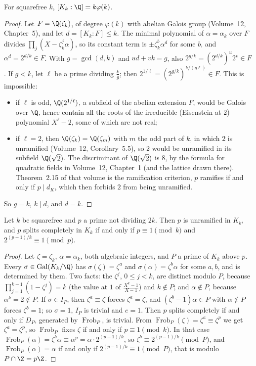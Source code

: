 \begin{lemma}\label{lem:kummerdeg}
For squarefree $k$, $[K_k:\Q]=k\varphi(k)$.
\end{lemma}
\begin{proof}
Let $F=\Q(\zeta_k)$, of degree $\varphi(k)$ with abelian Galois group (Volume~12, Chapter~5), and let $d=[K_k:F]\le k$. The minimal polynomial of $\alpha=\alpha_k$ over $F$ divides $\prod_j(X-\zeta_k^j\alpha)$, so its constant term is $\pm\zeta_k^b\alpha^d$ for some $b$, and $\alpha^d=2^{d/k}\in F$. With $g=\gcd(d,k)$ and $ud+vk=g$, also $2^{g/k}=(2^{d/k})^u2^v\in F$. If $g<k$, let $\ell$ be a prime dividing $\frac kg$; then $2^{1/\ell}=(2^{g/k})^{k/(g\ell)}\in F$. This is impossible:
\begin{itemize}
\item if $\ell$ is odd, $\Q(2^{1/\ell})$, a subfield of the abelian extension $F$, would be Galois over $\Q$, hence contain all the roots of the irreducible (Eisenstein at $2$) polynomial $X^\ell-2$, some of which are not real;
\item if $\ell=2$, then $\Q(\zeta_k)=\Q(\zeta_m)$ with $m$ the odd part of $k$, in which $2$ is unramified (Volume~12, Corollary~5.5), so $2$ would be unramified in its subfield $\Q(\sqrt2)$. The discriminant of $\Q(\sqrt2)$ is $8$, by the formula for quadratic fields in Volume~12, Chapter~1 (and the lattice drawn there). Theorem~2.15 of that volume is the ramification criterion, $p$ ramifies if and only if $p\mid d_K$, which then forbids $2$ from being unramified.
\end{itemize}
So $g=k$, $k\mid d$, and $d=k$.
\end{proof}

\begin{lemma}\label{lem:kummersplit}
Let $k$ be squarefree and $p$ a prime not dividing $2k$. Then $p$ is unramified in $K_k$, and $p$ splits completely in $K_k$ if and only if $p\equiv1\pmod k$ and $2^{(p-1)/k}\equiv1\pmod p$.
\end{lemma}
\begin{proof}
Let $\zeta=\zeta_k$, $\alpha=\alpha_k$, both algebraic integers, and $P$ a prime of $K_k$ above $p$. Every $\sigma\in\operatorname{Gal}(K_k/\Q)$ has $\sigma(\zeta)=\zeta^a$ and $\sigma(\alpha)=\zeta^b\alpha$ for some $a,b$, and is determined by them. Two facts: the $\zeta^j$, $0\le j<k$, are distinct modulo $P$, because $\prod_{j=1}^{k-1}(1-\zeta^j)=k$ (the value at $1$ of $\frac{X^k-1}{X-1}$) and $k\notin P$; and $\alpha\notin P$, because $\alpha^k=2\notin P$.
If $\sigma\in I_P$, then $\zeta^a\equiv\zeta$ forces $\zeta^a=\zeta$, and $(\zeta^b-1)\alpha\in P$ with $\alpha\notin P$ forces $\zeta^b=1$; so $\sigma=1$, $I_P$ is trivial and $e=1$.
Then $p$ splits completely if and only if $D_P$, generated by $\operatorname{Frob}_P$, is trivial. From $\operatorname{Frob}_P(\zeta)=\zeta^a\equiv\zeta^p$ we get $\zeta^a=\zeta^p$, so $\operatorname{Frob}_P$ fixes $\zeta$ if and only if $p\equiv1\pmod k$. In that case $\operatorname{Frob}_P(\alpha)=\zeta^b\alpha\equiv\alpha^p=\alpha\cdot2^{(p-1)/k}$, so $\zeta^b\equiv2^{(p-1)/k}\pmod P$, and $\operatorname{Frob}_P(\alpha)=\alpha$ if and only if $2^{(p-1)/k}\equiv1\pmod P$, that is modulo $P\cap\Z=p\Z$.
\end{proof}

